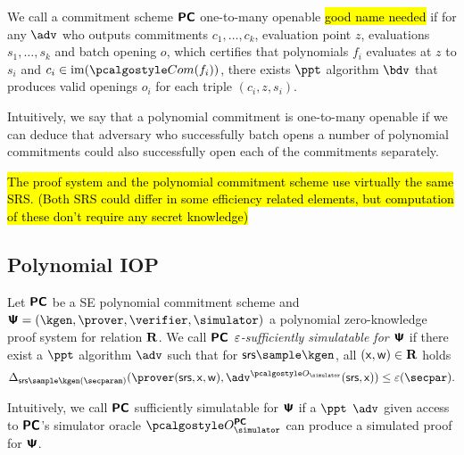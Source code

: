 \documentclass[runningheads,11pt]{llncs}
\begin{document}
 \begin{definition}
   We call a commitment scheme $\bm{\mathsf{PC}}$ one-to-many openable \hl{good name
     needed} if for any $\adv$ who outputs commitments $c_1, \ldots, c_k$,
   evaluation point $z$, evaluations $s_1, \ldots, s_k$ and batch opening $o$,
   which certifies that polynomials $f_i$ evaluates at $z$ to $s_i$ and
   $c_i \in \image(\com(f_i))$, there exists $\ppt$ algorithm $\bdv$ that
   produces valid openings $o_i$ for each triple $(c_i, z, s_i)$.
 \end{definition}
 Intuitively, we say that a polynomial commitment is one-to-many openable if we
 can deduce that adversary who successfully batch opens a number of polynomial
 commitments could also successfully open each of the commitments separately.


 \begin{definition}
\hl{The proof system and the polynomial commitment scheme use virtually the same
SRS. (Both SRS could differ in some efficiency related elements, but computation
of these don't require any secret knowledge)}
   \end{definition}

\subsection{Polynomial IOP}
 \begin{definition}
   Let $\bm{\mathsf{PC}}$ be a SE polynomial commitment scheme and
   $\PS = (\kgen, \prover, \verifier, \simulator)$ a polynomial zero-knowledge proof system
   for relation $\mathbf{R}$. We call $\bm{\mathsf{PC}}$ \emph{$\varepsilon$-sufficiently simulatable for
     $\bm{\mathsf{\Psi}}$} if there exist a $\ppt$ algorithm $\adv$ such that for
   $\srs \sample \kgen$, all $(\mathsf{x}, \mathsf{w}) \in \mathbf{R}$ holds
   \[
     \SD_{\srs \sample \kgen(\secparam)}(\prover(\srs, \inp, \wit),
     \adv^{\oracles}(\srs, \inp)) \leq \eps(\secpar).
   \]
 \end{definition}
 Intuitively, we call $\bm{\mathsf{PC}}$ sufficiently simulatable for $\bm{\mathsf{\Psi}}$ if a $\ppt$
 $\adv$ given access to $\bm{\mathsf{PC}}$'s simulator oracle $\oraclespcom$ can produce a
 simulated proof for $\bm{\mathsf{\Psi}}$.
\end{document}
